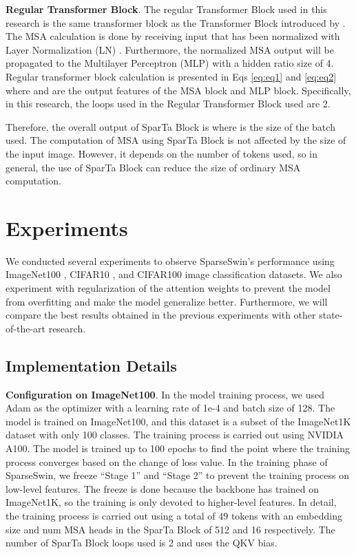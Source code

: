 \documentclass[runningheads]{llncs}
\begin{document}
\textbf{Regular Transformer Block}. The regular Transformer Block used in this research is the same transformer block as the Transformer Block introduced by \cite{vaswani2017attention}. The MSA calculation is done by receiving  input that has been normalized with Layer Normalization (LN) \cite{ba2016layer}. Furthermore, the normalized MSA output will be propagated to the Multilayer Perceptron (MLP) with a hidden ratio size of 4. Regular transformer block calculation is presented in Eqs \ref{eq:eq1} and \ref{eq:eq2} where   and  are the output features of the MSA block and MLP block. Specifically, in this research, the loops used in the Regular Transformer Block used are 2.





Therefore, the overall output of SparTa Block is     where  is the size of the batch used. The computation of MSA using SparTa Block is not affected by the size of the input image. However, it depends on the number of tokens used, so in general, the use of SparTa Block can reduce the size of ordinary MSA computation.

\section{Experiments}
\label{sec:experiments}
We conducted several experiments to observe SparseSwin's performance using ImageNet100 \cite{russakovsky2015imagenet}, CIFAR10 \cite{NIPS2012_c399862d}, and CIFAR100 \cite{NIPS2012_c399862d} image classification datasets. We also experiment with regularization of the attention weights to prevent the model from overfitting and make the model generalize better. Furthermore, we will compare the best results obtained in the previous experiments with other state-of-the-art research.

\subsection{Implementation Details}
\label{sec:Implementation_Details}
\textbf{Configuration on ImageNet100}. In the model training process, we used Adam \cite{kingma2014adam} as the optimizer with a learning rate of 1e-4 and batch size of 128. The model is trained on ImageNet100, and this dataset is a subset of the ImageNet1K dataset with only 100 classes. The training process is carried out using NVIDIA A100. The model is trained up to 100 epochs to find the point where the training process converges based on the change of loss value. In the training phase of SparseSwin, we freeze “Stage 1” and “Stage 2” to prevent the training process on low-level features. The freeze is done because the backbone has trained on ImageNet1K, so the training is only devoted to higher-level features. In detail, the training process is carried out using a total of 49 tokens with an embedding size and num MSA heads in the SparTa Block of 512 and 16 respectively. The number of SparTa Block loops used is 2 and uses the QKV bias.
\end{document}
